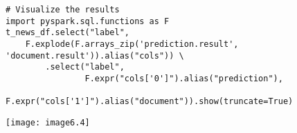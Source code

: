 \documentclass[]{article}
\begin{document}
\begin{verbatim}
# Visualize the results
import pyspark.sql.functions as F
t_news_df.select("label",
	F.explode(F.arrays_zip('prediction.result', 'document.result')).alias("cols")) \
		.select("label",
				F.expr("cols['0']").alias("prediction"),
				F.expr("cols['1']").alias("document")).show(truncate=True)
\end{verbatim}
\texttt{[image: image6.4]} 
\end{document}
